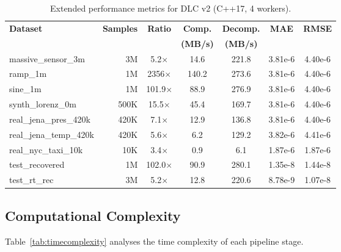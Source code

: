 \documentclass[runningheads]{llncs}
\begin{document}
\begin{table}[t]
\centering
\caption{Extended performance metrics for DLC v2 (C++17, 4 workers).}
\label{tab:throughput}
\scriptsize
\begin{tabular}{lrccccc}
\toprule
\textbf{Dataset} & \textbf{Samples} & \textbf{Ratio} & \textbf{Comp.} & \textbf{Decomp.} & \textbf{MAE} & \textbf{RMSE} \\
 & & & \textbf{(MB/s)} & \textbf{(MB/s)} & & \\
\midrule
massive\_sensor\_3m & 3M & 5.2$\times$ & 14.6 & 221.8 & 3.81e-6 & 4.40e-6 \\
ramp\_1m & 1M & 2356$\times$ & 140.2 & 273.6 & 3.81e-6 & 4.40e-6 \\
sine\_1m & 1M & 101.9$\times$ & 88.9 & 276.9 & 3.81e-6 & 4.40e-6 \\
synth\_lorenz\_0m & 500K & 15.5$\times$ & 45.4 & 169.7 & 3.81e-6 & 4.40e-6 \\
real\_jena\_pres\_420k & 420K & 7.1$\times$ & 12.9 & 136.8 & 3.81e-6 & 4.40e-6 \\
real\_jena\_temp\_420k & 420K & 5.6$\times$ & 6.2 & 129.2 & 3.82e-6 & 4.41e-6 \\
real\_nyc\_taxi\_10k & 10K & 3.4$\times$ & 0.9 & 6.1 & 1.87e-6 & 1.87e-6 \\
test\_recovered & 1M & 102.0$\times$ & 90.9 & 280.1 & 1.35e-8 & 1.44e-8 \\
test\_rt\_rec & 3M & 5.2$\times$ & 12.8 & 220.6 & 8.78e-9 & 1.07e-8 \\
\bottomrule
\end{tabular}
\end{table}

\subsection{Computational Complexity}
\label{sec:complexity}

Table~\ref{tab:timecomplexity} analyses the time complexity of each pipeline stage.
\end{document}
